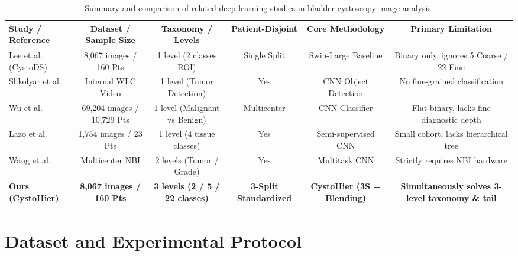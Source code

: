 \documentclass[runningheads]{llncs}
\begin{document}
\begin{table}[t]
\centering
\caption{Summary and comparison of related deep learning studies in bladder cystoscopy image analysis.}
\label{tab:related_work}
\begin{adjustbox}{max width=\textwidth}
\begin{tabular}{lccccc}
\toprule
\textbf{Study / Reference} & \textbf{Dataset / Sample Size} & \textbf{Taxonomy / Levels} & \textbf{Patient-Disjoint} & \textbf{Core Methodology} & \textbf{Primary Limitation} \\
\midrule
Lee et al. (CystoDS) \cite{ref_lee2026cystods} & 8,067 images / 160 Pts & 1 level (2 classes ROI) & Single Split & Swin-Large Baseline & Binary only, ignores 5 Coarse / 22 Fine \\
Shkolyar et al. \cite{ref_shkolyar2019augmented} & Internal WLC Video & 1 level (Tumor Detection) & Yes & CNN Object Detection & No fine-grained classification \\
Wu et al. \cite{ref_wu2022multicenter} & 69,204 images / 10,729 Pts & 1 level (Malignant vs Benign) & Multicenter & CNN Classifier & Flat binary, lacks fine diagnostic depth \\
Lazo et al. \cite{ref_lazo2023semisupervised} & 1,754 images / 23 Pts & 1 level (4 tissue classes) & Yes & Semi-supervised CNN & Small cohort, lacks hierarchical tree \\
Wang et al. \cite{ref_wang2026narrowband} & Multicenter NBI & 2 levels (Tumor / Grade) & Yes & Multitask CNN & Strictly requires NBI hardware \\
\textbf{Ours (CystoHier)} & \textbf{8,067 images / 160 Pts} & \textbf{3 levels (2 / 5 / 22 classes)} & \textbf{3-Split Standardized} & \textbf{CystoHier (3S + Blending)} & \textbf{Simultaneously solves 3-level taxonomy \& tail} \\
\bottomrule
\end{tabular}
\end{adjustbox}
\end{table}

\section{Dataset and Experimental Protocol}
\label{sec:dataset}
\end{document}
